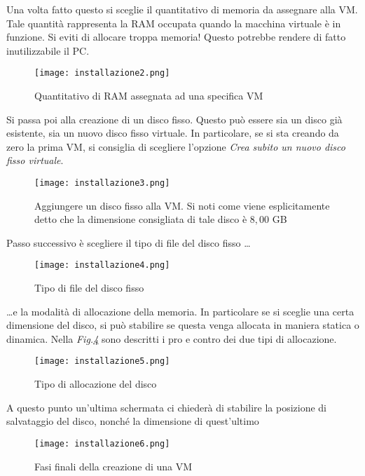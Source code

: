 \documentclass[14pt]{extreport}
\begin{document}
Una volta fatto questo si sceglie il quantitativo di memoria da assegnare alla VM. Tale quantità rappresenta la RAM occupata quando la macchina virtuale è in funzione. Si eviti di allocare troppa memoria! Questo potrebbe rendere di fatto inutilizzabile il PC. 

\begin{figure}[H]
    \centering
    \texttt{[image: installazione2.png]}
    \caption{Quantitativo di RAM assegnata ad una specifica VM}
    \label{vbinsta2}
\end{figure}

Si passa poi alla creazione di un disco fisso. Questo può essere sia un disco già esistente, sia un nuovo disco fisso virtuale. In particolare, se si sta creando da zero la prima VM, si consiglia di scegliere l'opzione \textit{Crea subito un nuovo disco fisso virtuale}.


\begin{figure}[H]
    \centering
    \texttt{[image: installazione3.png]}
    \caption{Aggiungere un disco fisso alla VM. Si noti come viene esplicitamente detto che la dimensione consigliata di tale disco è $8,00$ GB}
    \label{vbinsta3}
\end{figure}

Passo successivo è scegliere il tipo di file del disco fisso \ldots




\begin{figure}[H]
    \centering
    \texttt{[image: installazione4.png]}
    \caption{Tipo di file del disco fisso}
    \label{vbinsta4}
\end{figure}


\ldots e la modalità di allocazione della memoria. In particolare se si sceglie una certa dimensione del disco, si può stabilire se questa venga allocata in maniera statica o dinamica. Nella \textit{Fig.\ref{vbinsta5}} sono descritti i pro e contro dei due tipi di allocazione.

\begin{figure}[H]
    \centering
    \texttt{[image: installazione5.png]}
    \caption{Tipo di allocazione del disco}
    \label{vbinsta5}
\end{figure}

A questo punto un'ultima schermata ci chiederà di stabilire la posizione di salvataggio del disco, nonché la dimensione di quest'ultimo


\begin{figure}[H]
    \centering
    \texttt{[image: installazione6.png]}
    \caption{Fasi finali della creazione di una VM}
    \label{vbinsta6}
\end{figure}
\end{document}

